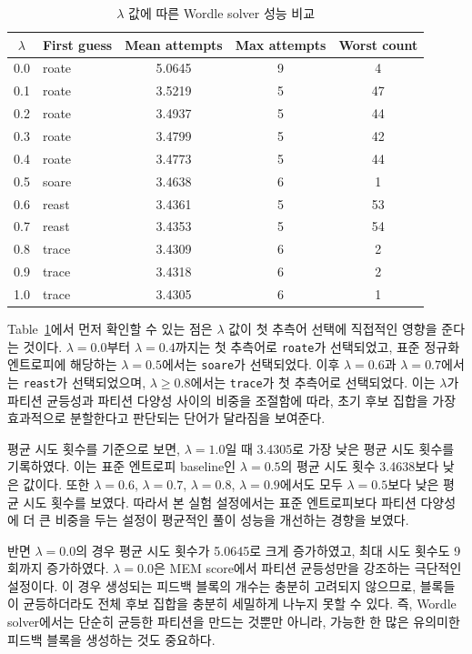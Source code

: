 \documentclass[11pt]{article}
\begin{document}
\begin{table}[H]
\centering
\caption{$\lambda$ 값에 따른 Wordle solver 성능 비교}
\label{tab:lambda-sweep}
\begin{tabular}{c l c c c}
\toprule
$\lambda$ & First guess & Mean attempts & Max attempts & Worst count \\
\midrule
0.0 & roate & 5.0645 & 9 & 4 \\
0.1 & roate & 3.5219 & 5 & 47 \\
0.2 & roate & 3.4937 & 5 & 44 \\
0.3 & roate & 3.4799 & 5 & 42 \\
0.4 & roate & 3.4773 & 5 & 44 \\
0.5 & soare & 3.4638 & 6 & 1 \\
0.6 & reast & 3.4361 & 5 & 53 \\
0.7 & reast & 3.4353 & 5 & 54 \\
0.8 & trace & 3.4309 & 6 & 2 \\
0.9 & trace & 3.4318 & 6 & 2 \\
1.0 & trace & 3.4305 & 6 & 1 \\
\bottomrule
\end{tabular}
\end{table}

Table~\ref{tab:lambda-sweep}에서 먼저 확인할 수 있는 점은 $\lambda$ 값이 첫 추측어 선택에 직접적인 영향을 준다는 것이다.
$\lambda = 0.0$부터 $\lambda = 0.4$까지는 첫 추측어로 \texttt{roate}가 선택되었고,
표준 정규화 엔트로피에 해당하는 $\lambda = 0.5$에서는 \texttt{soare}가 선택되었다.
이후 $\lambda = 0.6$과 $\lambda = 0.7$에서는 \texttt{reast}가 선택되었으며,
$\lambda \geq 0.8$에서는 \texttt{trace}가 첫 추측어로 선택되었다.
이는 $\lambda$가 파티션 균등성과 파티션 다양성 사이의 비중을 조절함에 따라,
초기 후보 집합을 가장 효과적으로 분할한다고 판단되는 단어가 달라짐을 보여준다.

평균 시도 횟수를 기준으로 보면, $\lambda = 1.0$일 때 3.4305로 가장 낮은 평균 시도 횟수를 기록하였다.
이는 표준 엔트로피 baseline인 $\lambda = 0.5$의 평균 시도 횟수 3.4638보다 낮은 값이다.
또한 $\lambda = 0.6$, $\lambda = 0.7$, $\lambda = 0.8$, $\lambda = 0.9$에서도 모두 $\lambda = 0.5$보다 낮은 평균 시도 횟수를 보였다.
따라서 본 실험 설정에서는 표준 엔트로피보다 파티션 다양성에 더 큰 비중을 두는 설정이 평균적인 풀이 성능을 개선하는 경향을 보였다.

반면 $\lambda = 0.0$의 경우 평균 시도 횟수가 5.0645로 크게 증가하였고,
최대 시도 횟수도 9회까지 증가하였다.
$\lambda = 0.0$은 MEM score에서 파티션 균등성만을 강조하는 극단적인 설정이다.
이 경우 생성되는 피드백 블록의 개수는 충분히 고려되지 않으므로,
블록들이 균등하더라도 전체 후보 집합을 충분히 세밀하게 나누지 못할 수 있다.
즉, Wordle solver에서는 단순히 균등한 파티션을 만드는 것뿐만 아니라,
가능한 한 많은 유의미한 피드백 블록을 생성하는 것도 중요하다.
\end{document}
